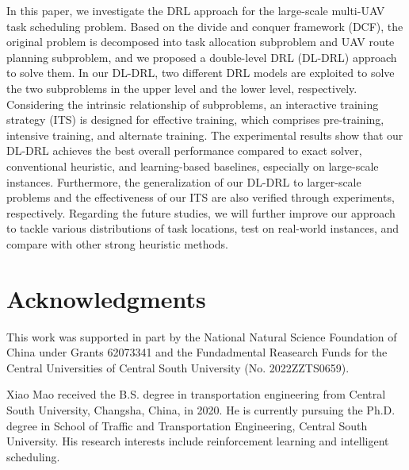 \documentclass[lettersize,journal]{IEEEtran}
\begin{document}
	In this paper, we investigate the DRL approach for the large-scale multi-UAV task scheduling problem. Based on the divide and conquer framework (DCF), the original problem is decomposed into task allocation subproblem and UAV route planning subproblem, and we proposed a double-level DRL (DL-DRL) approach to solve them. In our DL-DRL, two different DRL models are exploited to solve the two subproblems in the upper level and the lower level, respectively. Considering the intrinsic relationship of subproblems, an interactive training strategy (ITS) is designed for effective training, which comprises pre-training, intensive training, and alternate training. The experimental results show that our DL-DRL achieves the best overall performance compared to exact solver, conventional heuristic, and learning-based baselines, especially on large-scale instances. Furthermore, the generalization of our DL-DRL to larger-scale problems and the effectiveness of our ITS are also verified through experiments, respectively. Regarding the future studies, we will further improve our approach to tackle various distributions of task locations, test on real-world instances, and compare with other strong heuristic methods.
	
	
	\section{Acknowledgments}
	
	This work was supported in part by the National Natural Science Foundation of China under Grants 62073341 and the Fundadmental Reasearch Funds for the Central Universities of Central South University (No. 2022ZZTS0659).
	
	
	
	
	
	
	
	\begin{IEEEbiography}{Xiao Mao}{\space}
		received the B.S. degree in transportation engineering from Central South University, Changsha, China, in 2020. He is currently pursuing the Ph.D. degree in School of Traffic and Transportation Engineering, Central South University. His research interests include reinforcement learning and intelligent scheduling.
	\end{IEEEbiography}
	
\end{document}
